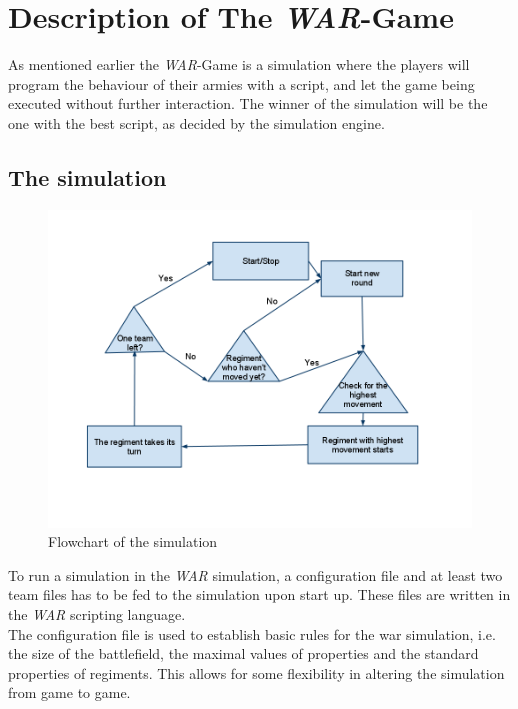 
\section{ Description of The \textit{WAR}-Game }
\label{sec:describeWAR}
As mentioned earlier the \textit{WAR}-Game is a simulation where the players will program the behaviour of their armies with a script, and let the game being executed without further interaction. The winner of the simulation will be the one with the best script, as decided by the simulation engine. \\
	\subsection{The simulation}
	\begin{figure}
	\centering
	\includegraphics[scale=0.5]{rapport/2/figures/FlowChartSimulation}
	\caption{ Flowchart of the simulation } \label{fig:FlowChartSimulation}
	\end{figure}		
		To run a simulation in the \textit{WAR} simulation, a configuration file and at least two team files has to be fed to the simulation upon start up. 
		These files are written in the \textit{WAR} scripting language.
		\\
		The configuration file is used to establish basic rules for the war simulation, i.e. the size of the battlefield, the maximal values of properties and the standard properties of regiments.
		This allows for some flexibility in altering the simulation from game to game.
